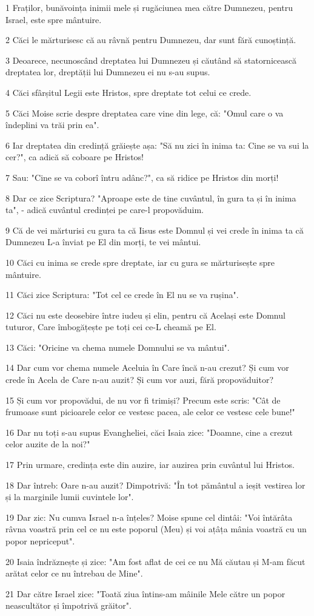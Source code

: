 \par 1 Fraților, bunăvoința inimii mele și rugăciunea mea către Dumnezeu, pentru Israel, este spre mântuire.
\par 2 Căci le mărturisesc că au râvnă pentru Dumnezeu, dar sunt fără cunoștință.
\par 3 Deoarece, necunoscând dreptatea lui Dumnezeu și căutând să statornicească dreptatea lor, dreptății lui Dumnezeu ei nu s-au supus.
\par 4 Căci sfârșitul Legii este Hristos, spre dreptate tot celui ce crede.
\par 5 Căci Moise scrie despre dreptatea care vine din lege, că: "Omul care o va îndeplini va trăi prin ea".
\par 6 Iar dreptatea din credință grăiește așa: "Să nu zici în inima ta: Cine se va sui la cer?", ca adică să coboare pe Hristos!
\par 7 Sau: "Cine se va coborî întru adânc?", ca să ridice pe Hristos din morți!
\par 8 Dar ce zice Scriptura? "Aproape este de tine cuvântul, în gura ta și în inima ta", - adică cuvântul credinței pe care-l propovăduim.
\par 9 Că de vei mărturisi cu gura ta că Iisus este Domnul și vei crede în inima ta că Dumnezeu L-a înviat pe El din morți, te vei mântui.
\par 10 Căci cu inima se crede spre dreptate, iar cu gura se mărturisește spre mântuire.
\par 11 Căci zice Scriptura: "Tot cel ce crede în El nu se va rușina".
\par 12 Căci nu este deosebire între iudeu și elin, pentru că Același este Domnul tuturor, Care îmbogățește pe toți cei ce-L cheamă pe El.
\par 13 Căci: "Oricine va chema numele Domnului se va mântui".
\par 14 Dar cum vor chema numele Aceluia în Care încă n-au crezut? Și cum vor crede în Acela de Care n-au auzit? Și cum vor auzi, fără propovăduitor?
\par 15 Și cum vor propovădui, de nu vor fi trimiși? Precum este scris: "Cât de frumoase sunt picioarele celor ce vestesc pacea, ale celor ce vestesc cele bune!"
\par 16 Dar nu toți s-au supus Evangheliei, căci Isaia zice: "Doamne, cine a crezut celor auzite de la noi?"
\par 17 Prin urmare, credința este din auzire, iar auzirea prin cuvântul lui Hristos.
\par 18 Dar întreb: Oare n-au auzit? Dimpotrivă: "În tot pământul a ieșit vestirea lor și la marginile lumii cuvintele lor".
\par 19 Dar zic: Nu cumva Israel n-a înțeles? Moise spune cel dintâi: "Voi întărâta râvna voastră prin cel ce nu este poporul (Meu) și voi ațâța mânia voastră cu un popor nepriceput".
\par 20 Isaia îndrăznește și zice: "Am fost aflat de cei ce nu Mă căutau și M-am făcut arătat celor ce nu întrebau de Mine".
\par 21 Dar către Israel zice: "Toată ziua întins-am mâinile Mele către un popor neascultător și împotrivă grăitor".

